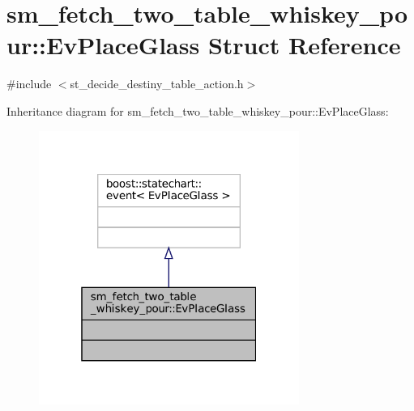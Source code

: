 \hypertarget{structsm__fetch__two__table__whiskey__pour_1_1EvPlaceGlass}{}\section{sm\+\_\+fetch\+\_\+two\+\_\+table\+\_\+whiskey\+\_\+pour\+:\+:Ev\+Place\+Glass Struct Reference}
\label{structsm__fetch__two__table__whiskey__pour_1_1EvPlaceGlass}


{\ttfamily \#include $<$st\+\_\+decide\+\_\+destiny\+\_\+table\+\_\+action.\+h$>$}



Inheritance diagram for sm\+\_\+fetch\+\_\+two\+\_\+table\+\_\+whiskey\+\_\+pour\+:\+:Ev\+Place\+Glass\+:
\nopagebreak
\begin{figure}[H]
\begin{center}
\leavevmode
\includegraphics[width=241pt]{structsm__fetch__two__table__whiskey__pour_1_1EvPlaceGlass__inherit__graph}
\end{center}
\end{figure}



